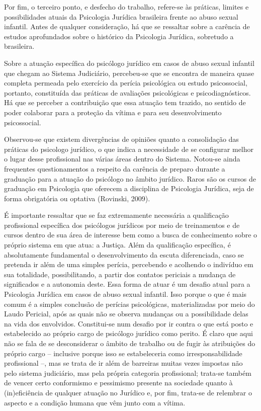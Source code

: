 Por fim, o terceiro ponto, e desfecho do trabalho, refere-se às práticas, limites e possibilidades atuais da Psicologia Jurídica brasileira frente ao abuso sexual infantil. Antes de qualquer consideração, há que se ressaltar sobre a carência de estudos aprofundados sobre o histórico da Psicologia Jurídica, sobretudo a brasileira. 

Sobre a atuação específica do psicólogo jurídico em casos de abuso sexual infantil que chegam ao Sistema Judiciário, percebeu-se que se encontra de maneira quase completa permeada pelo exercício da perícia psicológica ou estudo psicossocial, portanto, constituída das práticas de avaliações psicológicas e  psicodiagnósticos. Há que se perceber a contribuição que essa atuação tem trazido, no sentido de poder colaborar para a proteção da vítima e para seu desenvolvimento psicossocial. 

Observou-se que existem divergências de opiniões quanto a consolidação das práticas do psicologo jurídico, o que indica a necessidade de se configurar melhor o lugar desse profissional nas várias áreas dentro do Sistema. Notou-se ainda frequentes questionamentos a respeito da carência de preparo durante a graduação para a atuação do psicólogo no âmbito jurídico. Raros são os cursos de graduação em Psicologia que oferecem a disciplina de Psicologia Jurídica, seja de forma obrigatória ou optativa (Rovinski, 2009). 

É importante ressaltar que se faz extremamente necessária a qualificação profissional específica dos psicólogos jurídicos por meio de treinamentos e de cursos dentro de sua área de interesse bem como a busca de conhecimento sobre o próprio sistema em que atua: a Justiça. Além da qualificação específica, é absolutamente fundamental o desenvolvimento da escuta diferenciada, caso se pretenda ir além de uma simples perícia, percebendo e acolhendo o indivíduo em sua totalidade, possibilitando, a partir dos contatos periciais a mudança de significados e a autonomia deste. Essa forma de atuar é um desafio atual para a Psicologia Jurídica em casos de abuso sexual infantil. Isso porque o que é mais comum é a simples conclusão de perícias psicológicas, materializadas por meio do Laudo Pericial, após as quais não se observa mudanças ou a possibilidade delas na vida dos envolvidos. Constitui-se num desafio por ir contra o que está posto e estabelecido ao próprio cargo de psicólogo jurídico como perito. É claro que aqui não se fala de se desconsiderar o âmbito de trabalho ou de fugir às atribuições do próprio cargo -- inclusive porque isso se estabeleceria como irresponsabilidade profissional --, mas se trata de ir além de barreiras muitas vezes impostas não pelo sistema judiciário, mas pela própria categoria profissional; trata-se também de vencer certo conformismo e pessimismo presente na sociedade quanto à (in)eficiência de qualquer atuação no Jurídico e, por fim, trata-se de relembrar o aspecto e a condição humana que vêm junto com a vítima.

